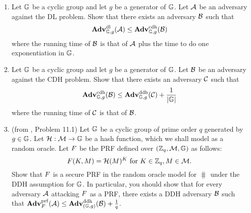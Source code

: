 \begin{enumerate}[label=\textbf{Exercise \thesection.\arabic*}, wide=0pt]
	\item Let $\mathbb{G}$ be a cyclic group and let $g$ be a generator of $\mathbb{G}$. Let ${\mathcal A}$ be an adversary against the DL problem. Show that there exists an adversary ${\mathcal B}$ such that 
	\begin{equation*}
		\mathbf{Adv}^{\mathrm{dl}}_{\mathbb{G},g}({\mathcal A}) \leq \mathbf{Adv}^{\mathrm{cdh}}_{\mathbb{G},g}({\mathcal B})
	\end{equation*}
	where the running time of ${\mathcal B}$ is that of ${\mathcal A}$ plus the time to do one exponentiation in $\mathbb{G}$. 
	
	\item Let $\mathbb{G}$ be a cyclic group and let $g$ be a generator of $\mathbb{G}$. Let ${\mathcal B}$ be an adversary against the CDH problem. Show that there exists an adversary ${\mathcal C}$ such that 
	\begin{equation*}
	\mathbf{Adv}^{\mathrm{cdh}}_{\mathbb{G},g}({\mathcal B}) \leq \mathbf{Adv}^{\mathrm{ddh}}_{\mathbb{G},g}({\mathcal C}) + \frac{1}{|\mathbb{G}|}
	\end{equation*}
	where the running time of ${\mathcal C}$ is that of ${\mathcal B}$.
	
	\item (from \cite{BonehShoupBook}, Problem 11.1) Let $\mathbb{G}$ be a cyclic group of prime order $q$ generated by $g\in \mathbb{G}$. Let $\mathcal{H}:{\cal M} \to \mathbb{G}$ be a hash function, which we shall model as a random oracle. Let $F$ be the PRF defined over $({{\mathbb Z}}_q,{\cal M},\mathbb{G})$ as follows:
	\begin{equation*}
		F(K,M) = \mathcal{H}(M)^K \textnormal{ for } K \in {{\mathbb Z}}_q, M \in {\cal M}.
	\end{equation*}
	Show that $F$ is a secure PRF in the random oracle model for $\hash$ under the DDH assumption for $\mathbb{G}$. In particular, you should show that for every adversary ${\mathcal A}$ attacking $F$ as a PRF, there exists a DDH adversary ${\mathcal B}$ such that $\mathbf{Adv}^{\mathrm{prf}}_{F}({\mathcal A})\leq \mathbf{Adv}^{\mathrm{ddh}}_{(\mathbb{G},g)}({\mathcal B}) + \frac{1}{q}$. 
	
	
\end{enumerate}